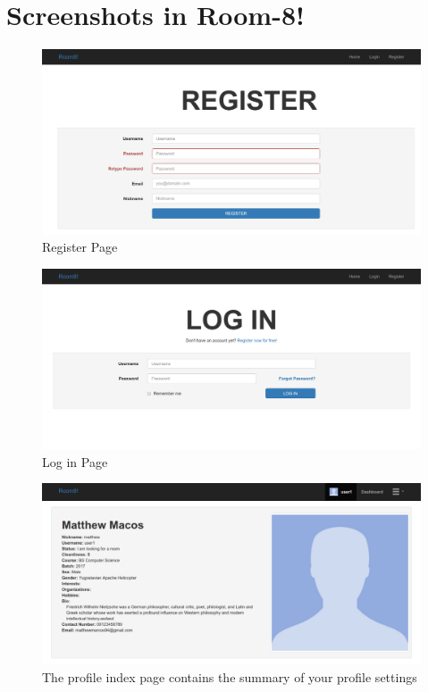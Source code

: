 \documentclass[journal]{IEEEtran}
\begin{document}
\section{Screenshots in Room-8!}
    \begin{figure}[h]
        \centering
        \includegraphics[scale=0.17]{register}
        \caption{Register Page}
        \label{Registration Page}
    \end{figure}
    \begin{figure}
        \centering
            \includegraphics[scale=0.17]{login.png}
            \caption{Log in Page}
            \label{Log in Page}
    \end{figure}
    \begin{figure}
        \centering
            \includegraphics[scale=0.17]{profileindex.png}
            \caption{The profile index page contains the summary of your profile settings}
            \label{Profile Index Page}
    \end{figure}
\end{document}
